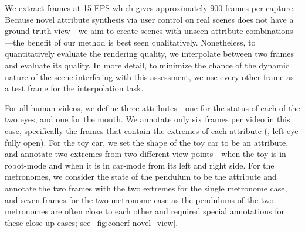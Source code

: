       We extract frames at 15 FPS which gives approximately 900 frames per
      capture.
      Because novel attribute synthesis via user control on real scenes does
      not have a ground truth view---we aim to create scenes with unseen
      attribute combinations---the benefit of our method is best seen
      qualitatively.
      Nonetheless, to quantitatively evaluate the rendering quality, we
      interpolate between two frames and evaluate its quality.
      In more detail, to minimize the chance of the dynamic nature of the
      scene interfering with this assessment, we use every other frame as a
      test frame for the interpolation task.

      For all human videos, we define three attributes---one for the status of
      each of the two eyes, and one for the mouth.
      We annotate only six frames per video in this case, specifically the
      frames that contain the extremes of each attribute (\eg, left eye fully
      open).
      For the toy car, we set the shape of the toy car to be an attribute, and
      annotate two extremes from two different view points---when the toy is
      in robot-mode and when it is in car-mode from its left and right side.
      For the metronomes, we consider the state of the pendulum to be the
      attribute and annotate the two frames with the two extremes for the
      single metronome case, and seven frames for the two metronome case as
      the pendulums of the two metronomes are often close to each other and
      required special annotations for these close-up cases;
      see~\cref{fig:conerf-novel_view}.


